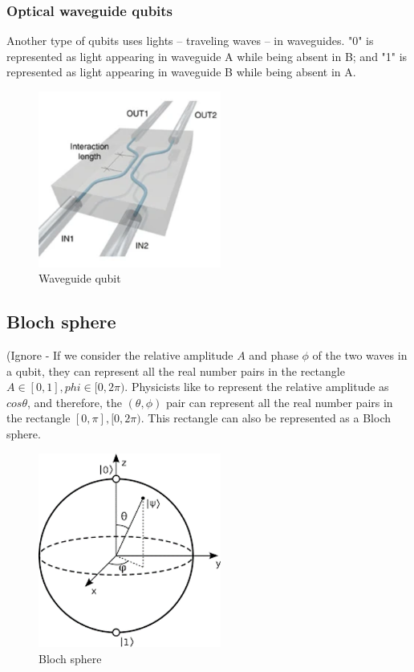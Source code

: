 \documentclass{book}
\begin{document}
\subsubsection{Optical waveguide qubits}
Another type of qubits uses lights -- traveling waves -- in waveguides. "0" is represented as light appearing in waveguide A while being absent in B; and "1" is represented as light appearing in waveguide B while being absent in A.
\begin{figure}[ht]
\includegraphics[width=6cm]{wguideQubit.png}
\caption{Waveguide qubit}
\label{Waveguide}
\end{figure}

\subsection{Bloch sphere}
(Ignore - If we consider the relative amplitude $A$ and phase $\phi$ of the two waves in a qubit, they can represent all the real number pairs in the rectangle ${ A \in [0,1], phi \in [0,2\pi) }$. Physicists like to represent the relative amplitude as $cos\theta$, and therefore, the $(\theta, \phi)$ pair can represent all the real number pairs in the rectangle ${[0,\pi],  [0,2\pi)}$. This rectangle can also be represented as a Bloch sphere.

\begin{figure}[ht]
\includegraphics[width=6cm]{blochSphere.png}
\caption{Bloch sphere}
\label{Bloch}
\end{figure}
\end{document}
